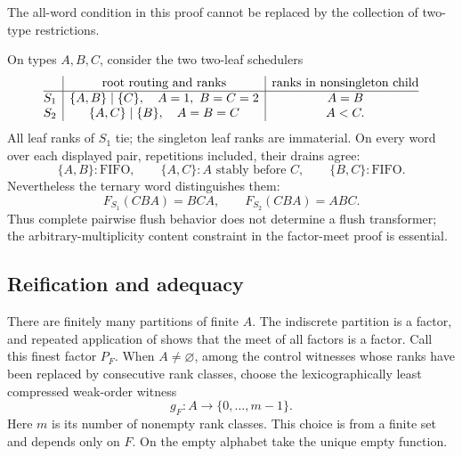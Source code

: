 The all-word condition in this proof cannot be replaced by the collection of
two-type restrictions.

\begin{example}
\label{ex:pairwise-insufficient}
On types \(A,B,C\), consider the two two-leaf schedulers
\begin{equation}
\begin{array}{@{}c|c|c@{}}
 & \text{root routing and ranks} & \text{ranks in nonsingleton child}\\
\hline
 S_1 & \{A,B\}\mid\{C\},\quad A=1,\ B=C=2
     & A=B\\
 S_2 & \{A,C\}\mid\{B\},\quad A=B=C
     & A<C.
\end{array}
\label{eq:pairwise-witness-schedulers}
\end{equation}
All leaf ranks of \(S_1\) tie; the singleton leaf ranks are immaterial.  On
every word over each displayed pair, repetitions included, their drains agree:
\begin{equation}
 \{A,B\}:\mathrm{FIFO},
 \qquad
 \{A,C\}:\text{\(A\) stably before \(C\)},
 \qquad
 \{B,C\}:\mathrm{FIFO}.
 \label{eq:pairwise-witness-restrictions}
\end{equation}
Nevertheless the ternary word distinguishes them:
\begin{equation}
  F_{S_1}(CBA)=BCA,
  \qquad
  F_{S_2}(CBA)=ABC.
  \label{eq:pairwise-witness-ternary}
\end{equation}
Thus complete pairwise flush behavior does not determine a flush transformer;
the arbitrary-multiplicity content constraint in the factor-meet proof is
essential.
\end{example}

\subsection{Reification and adequacy}

There are finitely many partitions of finite \(A\).  The indiscrete partition
is a factor, and repeated application of  shows that
the meet of all factors is a factor.  Call this finest factor \(P_F\).  When
\(A\ne\varnothing\), among the control witnesses whose ranks have been
replaced by consecutive rank classes, choose the lexicographically least
compressed weak-order witness
\[
 g_F:A\to\{0,\ldots,m-1\}.
\]
Here \(m\) is its number of nonempty rank classes.  This choice is from a
finite set and depends only on \(F\).  On the empty alphabet take the unique
empty function.

